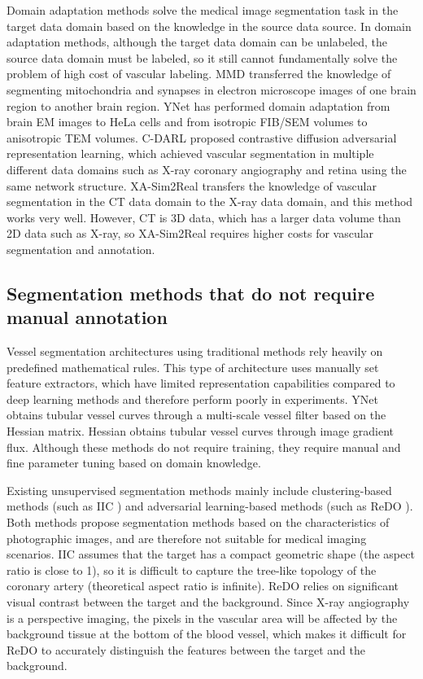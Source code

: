 Domain adaptation methods solve the medical image segmentation task in the target data domain based on the knowledge in the source data source. In domain adaptation methods, although the target data domain can be unlabeled, the source data domain must be labeled, so it still cannot fundamentally solve the problem of high cost of vascular labeling. MMD \cite{SSVS.3} transferred the knowledge of segmenting mitochondria and synapses in electron microscope images of one brain region to another brain region. YNet\cite{SSVS.31} has performed domain adaptation from brain EM images to HeLa cells and from isotropic FIB/SEM volumes to anisotropic TEM volumes. C-DARL\cite{01.00.C-DARL} proposed contrastive diffusion adversarial representation learning, which achieved vascular segmentation in multiple different data domains such as X-ray coronary angiography and retina using the same network structure. XA-Sim2Real\cite{00.01.XA-Sim2Real} transfers the knowledge of vascular segmentation in the CT data domain to the X-ray data domain, and this method works very well. However, CT is 3D data, which has a larger data volume than 2D data such as X-ray, so XA-Sim2Real requires higher costs for vascular segmentation and annotation.

\subsection{Segmentation methods that do not require manual annotation}

Vessel segmentation architectures using traditional methods rely heavily on predefined mathematical rules. 
This type of architecture uses manually set feature extractors, 
which have limited representation capabilities compared to deep learning methods and therefore perform poorly in experiments. 
YNet\cite{FC.31.YNet} obtains tubular vessel curves through a multi-scale vessel filter based on the Hessian matrix. Hessian\cite{FC.22.Hessian} obtains tubular vessel curves through image gradient flux. Although these methods do not require training, they require manual and fine parameter tuning based on domain knowledge.

Existing unsupervised segmentation methods mainly include clustering-based methods (such as IIC \cite{FC.19.IIC}) and adversarial learning-based methods (such as ReDO \cite{FC.9.ReDO}). Both methods propose segmentation methods based on the characteristics of photographic images, and are therefore not suitable for medical imaging scenarios. IIC assumes that the target has a compact geometric shape (the aspect ratio is close to 1), so it is difficult to capture the tree-like topology of the coronary artery (theoretical aspect ratio is infinite). ReDO relies on significant visual contrast between the target and the background. Since X-ray angiography is a perspective imaging, the pixels in the vascular area will be affected by the background tissue at the bottom of the blood vessel, which makes it difficult for ReDO to accurately distinguish the features between the target and the background.

